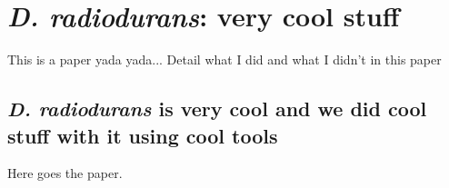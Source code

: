 \chapter{\textit{D. radiodurans}: very cool stuff}

This is a paper yada yada... Detail what I did and what I didn't in this paper

\section*{\textit{D. radiodurans} is very cool and we did cool stuff with it using cool tools}


Here goes the paper.

% 
